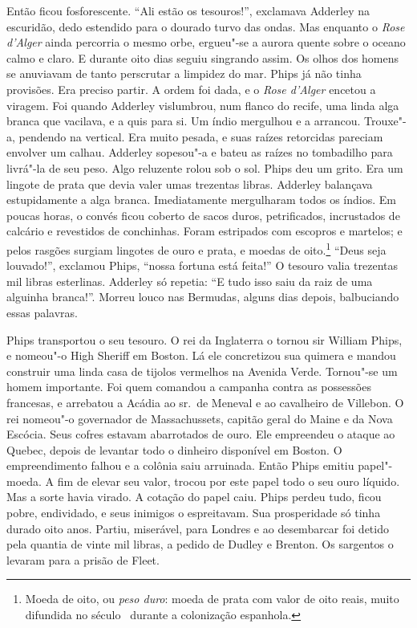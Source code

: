 Então ficou fosforescente. “Ali estão os tesouros!”, exclamava Adderley na
escuridão, dedo estendido para o dourado turvo das ondas. Mas enquanto o
\textit{Rose d’Alger} ainda percorria o mesmo orbe, ergueu"-se a aurora
quente sobre o oceano calmo e claro. E durante oito dias seguiu singrando
assim. Os olhos dos homens se anuviavam de tanto perscrutar a limpidez do
mar. Phips já não tinha provisões. Era preciso partir. A ordem foi dada, e
o \textit{Rose d’Alger} encetou a viragem. Foi quando Adderley vislumbrou,
num flanco do recife, uma linda alga branca que vacilava, e a quis para
si. Um índio mergulhou e a arrancou. Trouxe"-a, pendendo na vertical. Era
muito pesada, e suas raízes retorcidas pareciam envolver um calhau.
Adderley sopesou"-a e bateu as raízes no tombadilho para livrá"-la de seu
peso. Algo reluzente rolou sob o sol. Phips deu um grito. Era um lingote
de prata que devia valer umas trezentas libras. Adderley balançava
estupidamente a alga branca. Imediatamente mergulharam todos os índios. Em
poucas horas, o convés ficou coberto de sacos duros, petrificados,
incrustados de calcário e revestidos de conchinhas. Foram estripados com
escopros e martelos; e pelos rasgões surgiam lingotes de ouro e prata, e
moedas de oito.\footnote{ Moeda de oito, ou \textit{peso duro}: moeda de
prata com valor de oito reais, muito difundida no século~ durante a
colonização espanhola.} “Deus seja louvado!'', exclamou Phips, ``nossa
fortuna está feita!” O tesouro valia trezentas mil libras esterlinas.
Adderley só repetia: “E tudo isso saiu da raiz de uma alguinha branca!”.
Morreu louco nas Bermudas, alguns dias depois, balbuciando essas palavras.

Phips transportou o seu tesouro. O rei da Inglaterra o tornou sir William
Phips, e nomeou"-o High Sheriff em Boston. Lá ele concretizou sua quimera e
mandou construir uma linda casa de tijolos vermelhos na Avenida Verde.
Tornou"-se um homem importante. Foi quem comandou a campanha contra as
possessões francesas, e arrebatou a Acádia ao sr.~de Meneval e ao
cavalheiro de Villebon. O rei nomeou"-o governador de Massachussets,
capitão geral do Maine e da Nova Escócia. Seus cofres estavam abarrotados
de ouro. Ele empreendeu o ataque ao Quebec, depois de levantar todo o
dinheiro disponível em Boston. O empreendimento falhou e a colônia saiu
arruinada. Então Phips emitiu papel"-moeda. A fim de elevar seu valor,
trocou por este papel todo o seu ouro líquido. Mas a sorte havia virado. A
cotação do papel caiu. Phips perdeu tudo, ficou pobre, endividado, e seus
inimigos o espreitavam. Sua prosperidade só tinha durado oito anos.
Partiu, miserável, para Londres e ao desembarcar foi detido pela quantia
de vinte mil libras, a pedido de Dudley e Brenton. Os sargentos o levaram
para a prisão de Fleet.

